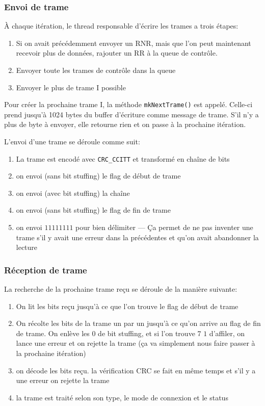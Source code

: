 \documentclass{article}
\begin{document}
    \subsubsection{Envoi de trame}
    À chaque itération, le thread responsable d'écrire les trames a trois étapes:
    \begin{enumerate}
        \item Si on avait précédemment envoyer un RNR, mais que l'on peut maintenant recevoir plus de données, rajouter un RR à la queue de contrôle.
        \item Envoyer toute les trames de contrôle dans la queue
        \item Envoyer le plus de trame I possible
    \end{enumerate}
    Pour créer la prochaine trame I, la méthode \verb#mkNextTrame()# est appelé. Celle-ci prend jusqu'à 1024 bytes du buffer d'écriture comme message de trame. S'il n'y a plus de byte à envoyer, elle retourne rien et on passe à la prochaine itération.

    L'envoi d'une trame se déroule comme suit:
    \begin{enumerate}
        \item La trame est encodé avec \verb#CRC_CCITT# et transformé en chaîne de bits
        \item on envoi (sans bit stuffing) le flag de début de trame
        \item on envoi (avec bit stuffing) la chaîne
        \item on envoi (sans bit stuffing) le flag de fin de trame
        \item on envoi $11111111$ pour bien délimiter --- Ça permet de ne pas inventer une trame s'il y avait une erreur dans la précédentes et qu'on avait abandonner la lecture
    \end{enumerate}

    \subsubsection{Réception de trame}
    La recherche de la prochaine trame reçu se déroule de la manière suivante:
    \begin{enumerate}
        \item On lit les bits reçu jusqu'à ce que l'on trouve le flag de début de trame
        \item On récolte les bits de la trame un par un jusqu'à ce qu'on arrive au flag de fin de trame. On enlève les $0$ de bit stuffing, et si l'on trouve 7 $1$ d'affiler, on lance une erreur et on rejette la trame (ça va simplement nous faire passer à la prochaine itération)
        \item on décode les bits reçu. la vérification CRC se fait en même temps et s'il y a une erreur on rejette la trame
        \item la trame est traité selon son type, le mode de connexion et le status
    \end{enumerate}
\end{document}
